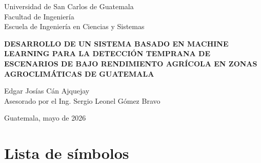 \documentclass[12pt,letterpaper,oneside]{report}
\begin{document}
\begin{titlepage}
\centering
{\Large Universidad de San Carlos de Guatemala\\}
{\Large Facultad de Ingeniería\\}
{\Large Escuela de Ingeniería en Ciencias y Sistemas\\[2.5cm]}

{\bfseries\Large DESARROLLO DE UN SISTEMA BASADO EN MACHINE LEARNING PARA LA DETECCIÓN TEMPRANA DE ESCENARIOS DE BAJO RENDIMIENTO AGRÍCOLA EN ZONAS AGROCLIMÁTICAS DE GUATEMALA\\[2.5cm]}

{\Large Edgar Josías Cán Ajquejay\\[0.5cm]}
{\large Asesorado por el Ing. Sergio Leonel Gómez Bravo\\[2.5cm]}

{\large Guatemala, mayo de 2026\\}
\end{titlepage}

\tableofcontents
\listoffigures
\listoftables
\clearpage

\chapter*{Lista de símbolos}
\end{document}
